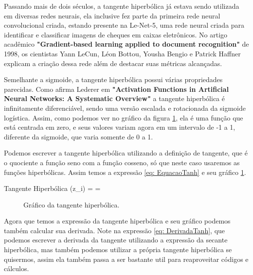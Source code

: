 Passando mais de dois séculos, a tangente hiperbólica já estava sendo utilizada em diversas redes neurais, ela inclusive fez parte da primeira rede neural convolucional criada, estando presente na Le-Net-5, uma rede neural criada para identificar e classificar imagens de cheques em caixas eletrônicos. No artigo acadêmico \textbf{"Gradient-based learning applied to document recognition"} de 1998, os cientistas Yann LeCun, Léon Bottou, Yousha Bengio e Patrick Haffner explicam a criação dessa rede além de destacar suas métricas alcançadas.

Semelhante a sigmoide, a tangente hiperbólica possui várias propriedades parecidas. Como afirma Lederer em \textbf{"Activation Functions in Artificial Neural Networks: A Systematic Overview"} a tangente hiperbólica é infinitamente diferenciável, sendo uma versão escalada e rotacionada da sigmoide logística. Assim, como podemos ver no gráfico da figura \ref{fig: GraphTanh}, ela é uma função que está centrada em zero, e seus valores variam agora em um intervalo de -1 a 1, diferente da sigmoide, que varia somente de 0 a 1.

Podemos escrever a tangente hiperbólica utilizando a definição de tangente, que é o quociente a função seno com a função cosseno, só que neste caso usaremos as funções hiperbólicas. Assim temos a expressão \ref{eq: EquacaoTanh} e seu gráfico \ref{fig: GraphTanh}.

\begin{equacaodestaque}{Tangente Hiperbólica}
    \tanh(z_i) =  = 
    \label{eq:tangente-hiperbolica}
\end{equacaodestaque}

\begin{figure}[h!]
    \centering
    \caption{Gráfico da tangente hiperbólica.}
    \label{fig: GraphTanh}
\end{figure}

Agora que temos a expressão da tangente hiperbólica e seu gráfico podemos também calcular sua derivada. Note na expressão \ref{eq: DerivadaTanh}, que podemos escrever a derivada da tangente utilizando a expressão da secante hiperbólica, mas também podemos utilizar a própria tangente hiperbólica se quisermos, assim ela também passa a ser bastante util para reaproveitar códigos e cálculos.

